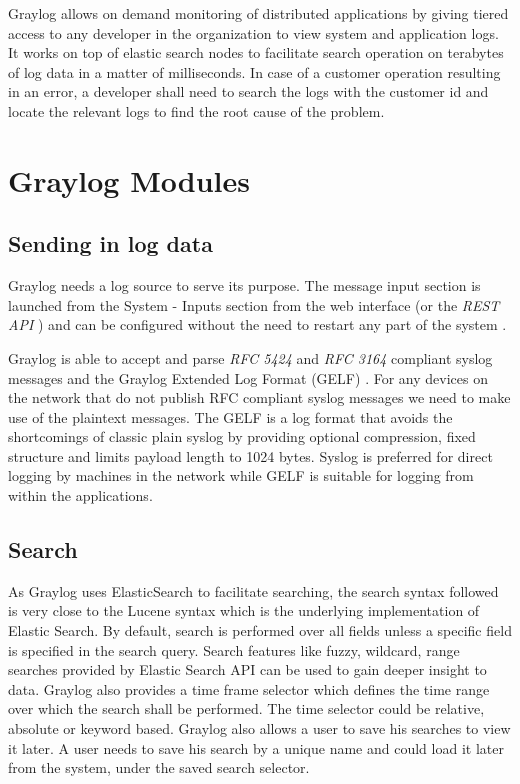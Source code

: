 \documentclass[9pt,twocolumn,twoside]{../../styles/osajnl}
\begin{document}
Graylog allows on demand monitoring of distributed applications by
giving tiered access to any developer in the organization to view
system and application logs. It works on top of elastic search nodes
to facilitate search operation on terabytes of log data in a matter
of milliseconds. In case of a customer operation resulting in an
error, a developer shall need to search the logs with the customer id
and locate the relevant logs to find the root cause of the problem.

\section{Graylog Modules}


\subsection{Sending in log data}

Graylog needs a log source to serve its purpose. The message input
section is launched from the System - Inputs section from the web
interface (or the \emph{REST API} \cite{www-rest-wiki}) and can be
configured without the need to restart any part of the system
\cite{www-graylog-sending_data}.

Graylog is able to accept and parse \emph{RFC 5424}
\cite{www-rfc5424-ietf} and \emph{RFC 3164} \cite{www-rfc3164-ietf}
compliant syslog messages and the Graylog Extended Log Format (GELF)
\cite{www-graylog-sending_data}. For any devices on the network that
do not publish RFC compliant syslog messages we need to make use of
the plaintext messages.  The GELF is a log format that avoids the
shortcomings of classic plain syslog by providing optional
compression, fixed structure and limits payload length to 1024
bytes. Syslog is preferred for direct logging by machines in the
network while GELF is suitable for logging from within the
applications.

\subsection{Search}

As Graylog uses ElasticSearch to facilitate searching, the search
syntax followed is very close to the Lucene syntax which is the
underlying implementation of Elastic Search. By default, search is
performed over all fields unless a specific field is specified in the
search query. Search features like fuzzy, wildcard, range searches
provided by Elastic Search API can be used to gain deeper insight to
data. Graylog also provides a time frame selector which defines the
time range over which the search shall be performed. The time selector
could be relative, absolute or keyword based.
Graylog also allows a user to save his searches to view it later. A
user needs to save his search by a unique name and could load it later
from the system, under the saved search selector.
 
\end{document}
